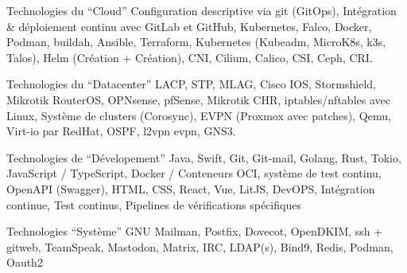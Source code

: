 
\begin{cvskills}

  \cvskill
    {Technologies du ``Cloud''}
    {
      Configuration descriptive via git (GitOps), Intégration \& déploiement continu avec GitLab et GitHub, \break
      Kubernetes, Falco, Docker, Podman, buildah, Ansible, Terraform, Kubernetes \break
      (Kubeadm, MicroK8s, k3s, Talos), Helm (Création + Création), CNI, Cilium, Calico, CSI, Ceph, CRI.
    } %

    \cvskill
    {Technologies du ``Datacenter''}
    {
      LACP, STP, MLAG, Cisco IOS, Stormshield, Mikrotik RouterOS, OPNsense, pfSense, Mikrotik CHR,          \break
      iptables/nftables avec Linux, Système de clusters (Corosync), EVPN (Proxmox avec patches), Qemu,      \break
      Virt-io par RedHat, OSPF, l2vpn evpn, GNS3.
    }

    \cvskill
    {Technologies de ``Dévelopement''}
    {
      Java, Swift, Git, Git-mail, Golang, Rust, Tokio, JavaScript / TypeScript, Docker / Conteneurs OCI,    \break
      système de test continu, OpenAPI (Swagger), HTML, CSS, React, Vue, LitJS, DevOPS,                     \break
      Intégration continue, Test continus, Pipelines de vérifications spécifiques                           \break
    }

    \cvskill
    {Technologies ``Système''}
    {
      GNU Mailman, Postfix, Dovecot, OpenDKIM, ssh + gitweb, TeamSpeak, Mastodon, Matrix, IRC, LDAP(s), \break
      Bind9, Redis, Podman, Oauth2   \break
    }

\end{cvskills}

